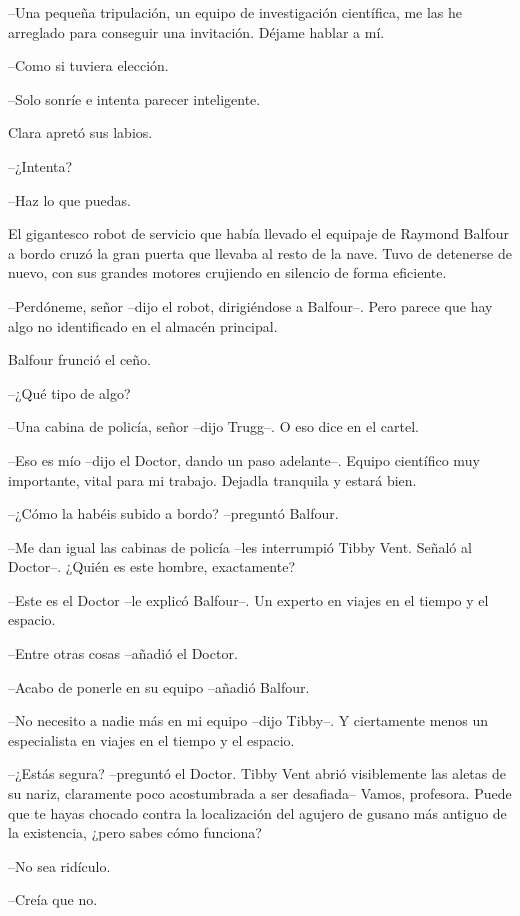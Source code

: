 {--Una pequeña tripulación, un equipo de investigación científica, me las
he arreglado para conseguir una invitación. Déjame hablar a mí.}

{--Como si tuviera elección.}

{--Solo sonríe e intenta parecer inteligente.}

{Clara apretó sus labios.}

{--¿Intenta?}

{--Haz lo que puedas.}

{El gigantesco robot de servicio que había llevado el equipaje de Raymond
 Balfour a bordo cruzó la gran puerta que llevaba al resto de la nave.
 Tuvo de detenerse de nuevo, con sus grandes motores crujiendo en
silencio de forma eficiente.}

{--Perdóneme, señor --dijo el robot, dirigiéndose a Balfour--. Pero
parece que hay algo no identificado en el almacén principal.}

{Balfour frunció el ceño.}

{--¿Qué tipo de algo?}

{--Una cabina de policía, señor --dijo Trugg--. O eso dice en el
cartel.}

{--Eso es mío --dijo el Doctor, dando un paso adelante--. Equipo
 científico muy importante, vital para mi trabajo. Dejadla tranquila y
estará bien.}

{--¿Cómo la habéis subido a bordo? --preguntó Balfour.}

{--Me dan igual las cabinas de policía --les interrumpió Tibby Vent.
Señaló al Doctor--. ¿Quién es este hombre, exactamente?}

{--Este es el Doctor --le explicó Balfour--. Un experto en viajes en el
tiempo y el espacio.}

{--Entre otras cosas --añadió el Doctor.}

{--Acabo de ponerle en su equipo --añadió Balfour.}

{--No necesito a nadie más en mi equipo --dijo Tibby--. Y ciertamente
menos un especialista en viajes en el tiempo y el espacio.}

{--¿Estás segura? --preguntó el Doctor. Tibby Vent abrió visiblemente las
 aletas de su nariz, claramente poco acostumbrada a ser desafiada--
 Vamos, profesora. Puede que te hayas chocado contra la localización del
 agujero de gusano más antiguo de la existencia, ¿pero sabes cómo
funciona?}

{--No sea ridículo.}

{--Creía que no.}

